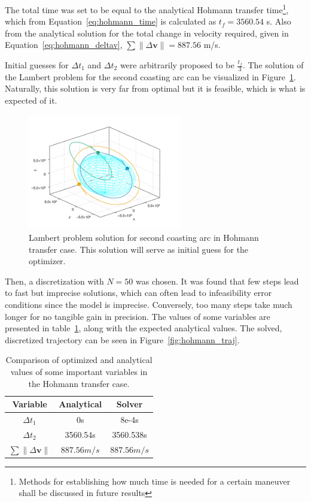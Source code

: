 The total time was set to be equal to the analytical Hohmann transfer time\footnote{Methods for establishing how much time is needed for a certain maneuver shall be discussed in future results}, which from Equation~\eqref{eq:hohmann_time} is calculated as \(t_f = 3560.54\) s. Also from the analytical solution for the total change in velocity required, given in Equation~\eqref{eq:hohmann_deltav}, \(\sum \lVert \Delta \mathbf{v} \rVert = 887.56\) m/s.

Initial guesses for \(\Delta t_1\) and \(\Delta t_2\) were arbitrarily proposed to be \(\frac{t_f}{3}\). The solution of the Lambert problem for the second coasting arc can be visualized in Figure~\ref{fig:hohmann_lambert}. Naturally, this solution is very far from optimal but it is feasible, which is what is expected of it.

\begin{figure}[htbp]
    \centering
    \includegraphics[width=0.6\textwidth]{img/hohmann_lambert_guess.png}
    \caption{Lambert problem solution for second coasting arc in Hohmann transfer case. This solution will serve as initial guess for the optimizer.}
    \label{fig:hohmann_lambert}
\end{figure}

Then, a discretization with \(N = 50\) was chosen. It was found that few steps lead to fast but imprecise solutions, which can often lead to infeasibility error conditions since the model is imprecise. Conversely, too many steps take much longer for no tangible gain in precision. The values of some variables are presented in table~\ref{tab:hohmann_results}, along with the expected analytical values. The solved, discretized trajectory can be seen in Figure~\ref{fig:hohmann_traj}.

\begin{table}[htbp]
    \centering
    \begin{tabular}{ccc} \toprule
        Variable & Analytical & Solver \\ \midrule
        \(\Delta t_1\) & 0s & 8e-4s \\
        \(\Delta t_2\) & 3560.54s & 3560.538s \\
        \(\sum \lVert \Delta \mathbf{v} \rVert\) & \(887.56m/s\) & \(887.56m/s\) \\ \bottomrule
    \end{tabular}
    \caption{Comparison of optimized and analytical values of some important variables in the Hohmann transfer case.}
    \label{tab:hohmann_results}
\end{table}

